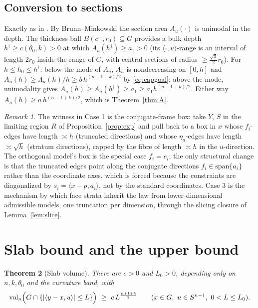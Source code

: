 \documentclass[11pt]{article}
\newtheorem{theorem}{Theorem}[section]
\theoremstyle{definition}
\theoremstyle{remark}
\newtheorem{remark}[theorem]{Remark}
\newcommand{\vol}{\operatorname{vol}}
\begin{document}
\subsection{Conversion to sections}

Exactly as in \cite[\S4]{companion11}.  By Brunn--Minkowski the section area
$A_u(\cdot)$ is unimodal in the depth.  The thickness ball $B(c^-,r_0)\subseteq
G$ provides a bulk depth $h^\dagger\ge c(\theta_0,k)>0$ at which
$A_u(h^\dagger)\ge a_1>0$ (its $\langle\cdot,u\rangle$-range is an interval of
length $2r_0$ inside the range of $G$, with central sections of radius
$\ge\frac{\sqrt3}2 r_0$).  For $h\le h_0\le h^\dagger$: below the mode of
$A_u$, $A_u$ is nondecreasing on $[0,h]$ and $A_u(h)\ge\Lambda_u(h)/h\ge
b\,h^{(n-1+k)/2}$ by \eqref{eq:capgoal}; above the mode, unimodality gives
$A_u(h)\ge A_u(h^\dagger)\ge a_1\ge a_1h^{(n-1+k)/2}$.  Either way
$A_u(h)\ge a\,h^{(n-1+k)/2}$, which is Theorem~\ref{thm:A}.

\begin{remark}\label{rem:device}
The witness in Case 1 is the conjugate-frame box: take $Y$, $S$ in the limiting
region $R$ of Proposition~\ref{prop:exp} and pull back to a box in $x$ whose
$f_i$-edges have length $\asymp h$ (truncated directions) and whose
$\eta_a$-edges have length $\asymp\sqrt h$ (stratum directions), capped by the
fibre of length $\asymp h$ in the $u$-direction.  The orthogonal model's box
\cite[\S4]{companion11} is the special case $f_i=e_i$; the only structural
change is that the truncated edges point along the conjugate directions
$f_i\in\mathrm{span}\{a_i\}$ rather than the coordinate axes, which is forced
because the constraints are diagonalized by $s_i=\langle x-p,a_i\rangle$, not by
the standard coordinates.  Case 3 is the mechanism by which face strata inherit
the law from lower-dimensional admissible models, one truncation per dimension,
through the slicing closure of Lemma~\ref{lem:slice}.
\end{remark}

\section{Slab bound and the upper bound}\label{sec:upper}

\begin{theorem}[Slab volume]\label{thm:slab}
There are $c>0$ and $L_0>0$, depending only on $n,k,\theta_0$ and the curvature
band, with
\[
\vol_n\Bigl(G\cap\{|\langle y-x,u\rangle|\le L\}\Bigr)\ \ge\
c\,L^{\frac{n+1+k}2}
\qquad(x\in G,\ u\in S^{n-1},\ 0<L\le L_0).
\]
\end{theorem}
\end{document}
